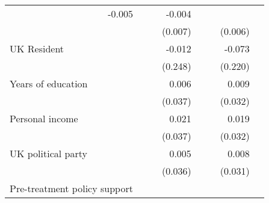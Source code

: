 \documentclass{article}
\begin{document}
\begin{table}[!h]
\begin{tabular}{llllllll}
  \multicolumn{1}{r}{-0.005} &
  \multicolumn{1}{l}{} &
  \multicolumn{1}{r}{} &
  \multicolumn{1}{r}{-0.004} &
  \multicolumn{1}{l}{} \\
\multicolumn{1}{l}{} &
  \multicolumn{1}{r}{} &
  \multicolumn{1}{l}{} &
  \multicolumn{1}{r}{(0.007)} &
  \multicolumn{1}{l}{} &
  \multicolumn{1}{r}{} &
  \multicolumn{1}{r}{(0.006)} &
  \multicolumn{1}{l}{} \\
\multicolumn{1}{l}{UK Resident} &
  \multicolumn{1}{r}{} &
  \multicolumn{1}{l}{} &
  \multicolumn{1}{r}{-0.012} &
  \multicolumn{1}{l}{} &
  \multicolumn{1}{r}{} &
  \multicolumn{1}{r}{-0.073} &
  \multicolumn{1}{l}{} \\
\multicolumn{1}{l}{} &
  \multicolumn{1}{r}{} &
  \multicolumn{1}{l}{} &
  \multicolumn{1}{r}{(0.248)} &
  \multicolumn{1}{l}{} &
  \multicolumn{1}{r}{} &
  \multicolumn{1}{r}{(0.220)} &
  \multicolumn{1}{l}{} \\
\multicolumn{1}{l}{Years of education} &
  \multicolumn{1}{r}{} &
  \multicolumn{1}{l}{} &
  \multicolumn{1}{r}{0.006} &
  \multicolumn{1}{l}{} &
  \multicolumn{1}{r}{} &
  \multicolumn{1}{r}{0.009} &
  \multicolumn{1}{l}{} \\
\multicolumn{1}{l}{} &
  \multicolumn{1}{r}{} &
  \multicolumn{1}{l}{} &
  \multicolumn{1}{r}{(0.037)} &
  \multicolumn{1}{l}{} &
  \multicolumn{1}{r}{} &
  \multicolumn{1}{r}{(0.032)} &
  \multicolumn{1}{l}{} \\
\multicolumn{1}{l}{Personal income} &
  \multicolumn{1}{r}{} &
  \multicolumn{1}{l}{} &
  \multicolumn{1}{r}{0.021} &
  \multicolumn{1}{l}{} &
  \multicolumn{1}{r}{} &
  \multicolumn{1}{r}{0.019} &
  \multicolumn{1}{l}{} \\
\multicolumn{1}{l}{} &
  \multicolumn{1}{r}{} &
  \multicolumn{1}{l}{} &
  \multicolumn{1}{r}{(0.037)} &
  \multicolumn{1}{l}{} &
  \multicolumn{1}{r}{} &
  \multicolumn{1}{r}{(0.032)} &
  \multicolumn{1}{l}{} \\
\multicolumn{1}{l}{UK political party} &
  \multicolumn{1}{r}{} &
  \multicolumn{1}{l}{} &
  \multicolumn{1}{r}{0.005} &
  \multicolumn{1}{l}{} &
  \multicolumn{1}{r}{} &
  \multicolumn{1}{r}{0.008} &
  \multicolumn{1}{l}{} \\
\multicolumn{1}{l}{} &
  \multicolumn{1}{r}{} &
  \multicolumn{1}{l}{} &
  \multicolumn{1}{r}{(0.036)} &
  \multicolumn{1}{l}{} &
  \multicolumn{1}{r}{} &
  \multicolumn{1}{r}{(0.031)} &
  \multicolumn{1}{l}{} \\
\multicolumn{1}{l}{Pre-treatment policy support} &
  \multicolumn{1}{r}{} &
  \multicolumn{1}{l}{} &

\end{tabular}
\end{table}
\end{document}
